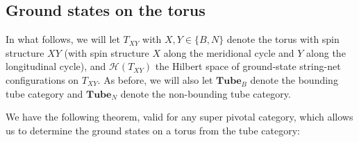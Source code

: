 \documentclass[12pt,a4paper]{article}
\newcommand{\mcz}{\mathcal{Z}}
\newcommand{\mch}{\mathcal{H}}
\newcommand\be            {\begin{equation}}
\newcommand\ee            {\end{equation}}
\newcommand{\tube}{\textbf{Tube}}
\begin{document}

\subsection{Ground states on the torus} \label{ground_states_on_torus}

In what follows, we will let $T_{XY}$ with $X,Y\in\{B,N\}$ denote the torus with spin structure $XY$
(with spin structure $X$ along the meridional cycle and $Y$ along the longitudinal cycle),
and $\mch(T_{XY})$ the Hilbert space of ground-state string-net configurations on $T_{XY}$.  
As before, we will also let $\tube_B$ denote the bounding tube category and $\tube_N$ denote the non-bounding tube category. 

We have the following theorem, valid for any super pivotal category, which allows us to determine 
the ground states on a torus from the tube category:
\end{document}
